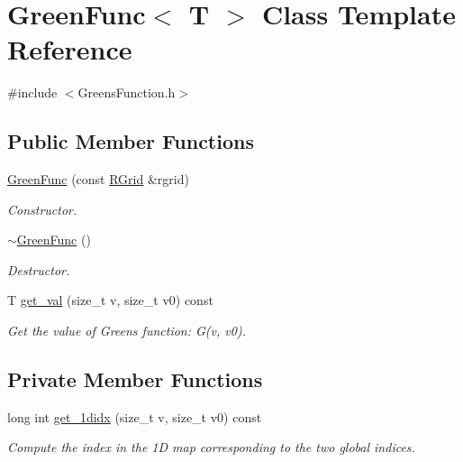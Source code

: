 \hypertarget{class_green_func}{}\section{Green\+Func$<$ T $>$ Class Template Reference}
\label{class_green_func}


{\ttfamily \#include $<$Greens\+Function.\+h$>$}

\subsection*{Public Member Functions}
\begin{DoxyCompactItemize}
\item 
\hyperlink{class_green_func_a8df32188adfab6dae187ecf4f994c07a}{Green\+Func} (const \hyperlink{struct_r_grid}{R\+Grid} \&rgrid)
\begin{DoxyCompactList}\small\item\em Constructor. \end{DoxyCompactList}\item 
\hyperlink{class_green_func_ad46acf5e9fc69c22244e1c34bf238f65}{$\sim$\+Green\+Func} ()
\begin{DoxyCompactList}\small\item\em Destructor. \end{DoxyCompactList}\item 
T \hyperlink{class_green_func_aaa1439355a01ce37371c7f0347c23065}{get\+\_\+val} (size\+\_\+t v, size\+\_\+t v0) const 
\begin{DoxyCompactList}\small\item\em Get the value of Green\textquotesingle{}s function\+: G(v, v0). \end{DoxyCompactList}\end{DoxyCompactItemize}
\subsection*{Private Member Functions}
\begin{DoxyCompactItemize}
\item 
long int \hyperlink{class_green_func_a4a809863bd810679626d77da29924703}{get\+\_\+1didx} (size\+\_\+t v, size\+\_\+t v0) const 
\begin{DoxyCompactList}\small\item\em Compute the index in the 1\+D map corresponding to the two global indices. \end{DoxyCompactList}\end{DoxyCompactItemize}
